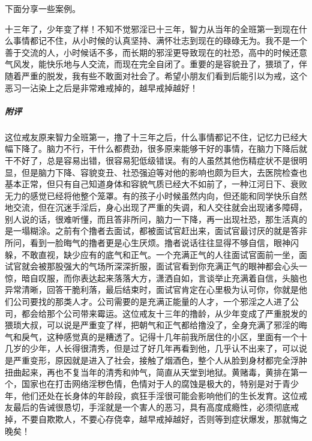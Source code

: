 下面分享一些案例。

\begin{case}
    十三年了，少年变了样！不知不觉邪淫已十三年，智力从当年的全班第一到现在什么事情都记不住，从小时候的认真坚持、满怀壮志到现在的碌碌无为。我不是一个善于交流的人，小时候话不多，而长期的邪淫更导致现在的社恐，高中的时候还意气风发，能快乐地与人交流，而现在完全自闭了。重要的是容貌丑了，猥琐了，伴随着严重的脱发，我有些不敢面对社会了。希望小朋友们看到后能引以为戒，这个恶习一沾染上之后是非常难戒掉的，越早戒掉越好！
    \subparagraph{附评} 这位戒友原来智力全班第一，撸了十三年之后，什么事情都记不住，记忆力已经大幅下降了。脑力不行，干什么都费劲，很多原来能够干好的事情，在脑力下降后就干不好了，总是容易出错，很容易犯低级错误。有的人虽然其他伤精症状不是很明显，但是脑力下降、容貌变丑、社恐强迫等对他的影响也颇为巨大，去医院检查也基本正常，但只有自己知道身体和容貌气质已经大不如前了，一种江河日下、衰败无力的感觉已经将他整个笼罩。有的孩子小时候虽然内向，但还能和同学快乐自然地交流，但在沉迷手淫后，身心出现了严重的失调，和人交往就会出现诸多障碍，别人说的话，很难听懂，而且答非所问，脑力一下降，再一出现社恐，那生活真的是一塌糊涂。之前有个撸者去面试，都被面试官赶出来，面试官最讨厌的就是答非所问，看到一脸晦气的撸者更是心生厌烦。撸者说话往往显得不够自信，眼神闪躲，不敢直视，缺少应有的底气和正气。一个充满正气的人往面试官面前一坐，面试官就会被那股强大的气场所深深折服，面试官看到你充满正气的眼神都会心头一惊，暗自叹服，而你表达起来落落大方，潇洒自如，言谈举止充满着自信，头脑也异常清晰，回答干脆利落，最后结束时，面试官肯定在心里极为认可你，你就是他们公司要找的那类人才。公司需要的是充满正能量的人才，一个邪淫之人进了公司，都会给那个公司带来霉运。这位戒友十三年的撸龄，从少年变成了严重脱发的猥琐大叔，可以说是严重变了样，把朝气和正气都给撸没了，全身充满了邪淫的晦气和戾气，这种感觉真的是糟透了。记得十几年前我所居住的小区，里面有一个十几岁的少年，人长得很清秀，但是过了好几年再看到他，几乎认不出来了，可以说是严重变形，原因就是进入了社会，接触了烟酒色，整个人从脸到身材都完全浮肿扭曲起来，再也不复当年的清秀和帅气，简直从天堂到地狱。黄赌毒，黄排在第一个，国家也在打击网络淫秽色情，色情对于人的腐蚀是极大的，特别是对于青少年，他们还处在长身体的年龄段，疯狂手淫很可能会影响他们的生长发育。这位戒友最后的告诫很恳切，手淫就是一个害人的恶习，具有高度成瘾性，必须彻底戒掉，不要自欺欺人，不要心存侥幸，越早戒掉越好，否则等到症状爆发，那就悔之晚矣！
\end{case}

